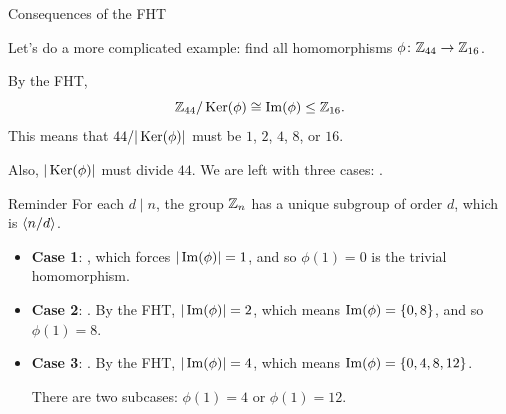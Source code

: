 \documentclass[8pt, handout]{beamer}
\newcommand{\Pause}{}      %
\begin{document}
\begin{frame}{Consequences of the FHT} %
  
  Let's do a more complicated example: find all homomorphisms
  $\phi\colon\mathbb{Z}_{44}\to\mathbb{Z}_{16}$. \medskip\Pause
  
  By the FHT,
  \[
  \mathbb{Z}_{44}/\operatorname{Ker}(\phi)\cong\operatorname{Im}(\phi)\leq\mathbb{Z}_{16}.
  \]
  \Pause This means that $44/|\operatorname{Ker}(\phi)|$ must be $1$, $2$, $4$, \st{$8$},
  or \st{$16$}.
  
  \medskip\Pause
  
  Also, $|\operatorname{Ker}(\phi)|$ must divide $44$. \Pause We are left with
  three cases: . \smallskip\Pause
  
  \begin{exampleblock}{Reminder}
    For each $d\mid n$, the group $\mathbb{Z}_n$ has a unique
    subgroup of order $d$, which is $\langle n/d\rangle$. 
  \end{exampleblock}
  
  \smallskip\Pause
  
  \begin{itemize}
  \item \textbf{Case 1}: , which forces
    $|\operatorname{Im}(\phi)|=1$, and so $\phi(1)=0$ is the trivial
    homomorphism. \medskip\Pause
  \item \textbf{Case 2}: . \Pause By the FHT,
    $|\operatorname{Im}(\phi)|=2$, which means $\operatorname{Im}(\phi)=\{0,8\}$, and so
    $\phi(1)=8$. \medskip\Pause
  \item \textbf{Case 3}: . \Pause By the FHT,
    $|\operatorname{Im}(\phi)|=4$, which means $\operatorname{Im}(\phi)=\{0,4,8,12\}$. \medskip\Pause
    
    There are two subcases: $\phi(1)=4$ or $\phi(1)=12$.
  \end{itemize}
  
\end{frame}

\end{document}
